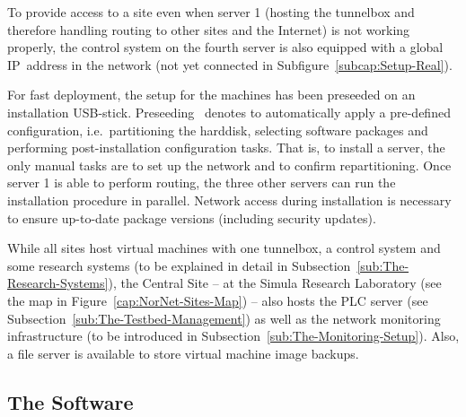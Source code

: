 To provide access to a site even when server 1 (hosting the tunnelbox and therefore handling routing to other  sites and the Internet) is not working properly, the control system on the fourth server is also equipped with a global IP~address in the  network (not yet connected in Subfigure~\ref{subcap:Setup-Real}).

For fast deployment, the  setup for the machines has been preseeded on an installation USB-stick. Preseeding~\cite{UbuntuServerGuide} denotes to automatically apply a pre-defined configuration, i.e.\ partitioning the harddisk, selecting software packages and performing post-installation configuration tasks. That is, to install a server, the only manual tasks are to set up the network and to confirm repartitioning. Once server 1 is able to perform routing, the three other servers can run the installation procedure in parallel. Network access during installation is necessary to ensure up-to-date package versions (including security updates).

While all sites host virtual machines with one tunnelbox, a control system and some research systems (to be explained in detail in Subsection~\ref{sub:The-Research-Systems}), the Central Site -- at the Simula Research Laboratory (see the map in Figure~\ref{cap:NorNet-Sites-Map}) -- also hosts the PLC server (see Subsection~\ref{sub:The-Testbed-Management}) as well as the network monitoring infrastructure (to be introduced in Subsection~\ref{sub:The-Monitoring-Setup}). Also, a file server is available to store virtual machine image backups.


\subsection{The Software}
\label{sub:The-Software}


